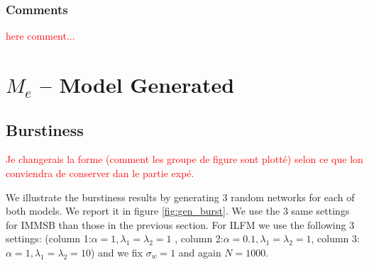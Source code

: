 \documentclass[a4paper, 12pt]{article}
\begin{document}




\subsubsection{Comments}
\textcolor{red}{here comment...} 

\section{$M_e$ -- Model Generated}
\label{sec:mgmg}

\subsection{Burstiness}

\textcolor{red}{Je changerais la forme (comment les groupe de figure sont plotté) selon ce que lon conviendra de conserver dan le partie expé.}

We illustrate the burstiness results by generating 3 random networks for each of both models. We report it in figure \ref{fig:gen_burst}. We use the 3 same settings for IMMSB  than those in the previous section. For ILFM  we use the following 3 settings: (column 1:$\alpha=1,  \lambda_1=\lambda_2=1$ , column 2:$\alpha=0.1, \lambda_1=\lambda_2=1$, column 3: $\alpha=1, \lambda_1=\lambda_2=10$) and we fix $\sigma_w=1$ and again $N=1000$.
\end{document}
